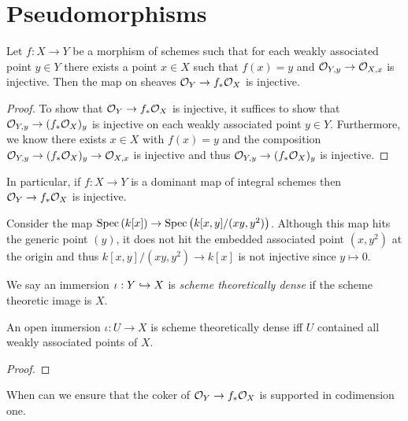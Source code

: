 \documentclass[12pt]{article}
\begin{document}
\section{Pseudomorphisms}

\begin{lemma}
Let $f : X \to Y$ be a morphism of schemes such that for each weakly associated point $y \in Y$ there exists a point $x \in X$ such that $f(x) = y$ and $\mathcal{O}_{Y, y} \to \mathcal{O}_{X, x}$ is injective. Then the map on sheaves $\mathcal{O}_{Y} \to f_* \mathcal{O}_{X}$ is injective.
\end{lemma}

\begin{proof}
To show that $\mathcal{O}_{Y} \to f_* \mathcal{O}_{X}$ is injective, it suffices to show that $\mathcal{O}_{Y, y} \to (f_* \mathcal{O}_{X})_y$ is injective on each weakly associated point $y \in Y$. Furthermore, we know there exists $x \in X$ with $f(x) = y$ and the composition $\mathcal{O}_{Y, y} \to (f_* \mathcal{O}_{X})_y \to \mathcal{O}_{X, x}$ is injective and thus $\mathcal{O}_{Y, y} \to (f_* \mathcal{O}_{X})_y$ is injective.
\end{proof}

\begin{rmk}
In particular, if $f : X \to Y$ is a dominant map of integral schemes then $\mathcal{O}_{Y} \to f_* \mathcal{O}_{X}$ is injective.
\end{rmk}

\begin{example}
Consider the map $\mathrm{Spec}\left( k[x] \right) \to \mathrm{Spec}\left( k[x,y]/(xy, y^2) \right)$. Although this map hits the generic point $(y)$, it does not hit the embedded associated point $(x, y^2)$ at the origin and thus $k[x,y]/(xy, y^2) \to k[x]$ is not injective since $y \mapsto 0$.
\end{example}

\begin{defn}
We say an immersion $\iota : Y \hookrightarrow X$ is \textit{scheme theoretically dense} if the scheme theoretic image is $X$. 
\end{defn}

\begin{lemma}
An open immersion $\iota : U \to X$ is scheme theoretically dense iff $U$ contained all weakly associated points of $X$.
\end{lemma}

\begin{proof}

\end{proof}

When can we ensure that the coker of $\mathcal{O}_{Y} \to f_* \mathcal{O}_{X}$ is supported in codimension one.
\end{document}

